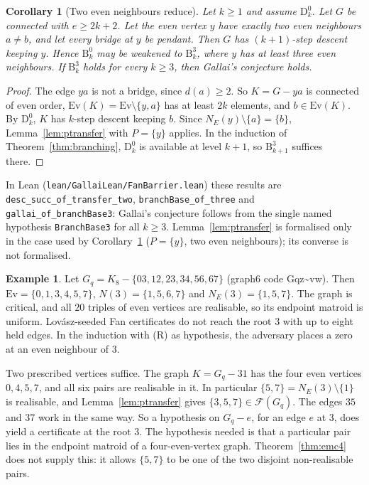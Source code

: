 \documentclass[11pt]{amsart}
\newtheorem{corollary}[theorem]{Corollary}
\theoremstyle{definition}
\newtheorem{example}[theorem]{Example}
\newcommand{\cF}{\mathcal F}
\newcommand{\Ev}{\mathrm{Ev}}
\begin{document}
\begin{corollary}[Two even neighbours reduce]\label{cor:twonbrs}
Let $k\ge1$ and assume $\mathrm{D}^0_k$. Let $G$ be connected with $e\ge 2k+2$. Let the even vertex
$y$ have exactly two even neighbours $a\ne b$, and let every bridge at $y$ be pendant. Then $G$ has
$(k+1)$-step descent keeping $y$. Hence $\mathrm{B}^0_k$ may be weakened to $\mathrm{B}^3_k$, where $y$
has at least three even neighbours. If $\mathrm{B}^3_k$ holds for every $k\ge3$, then Gallai's
conjecture holds.
\end{corollary}

\begin{proof}
The edge $ya$ is not a bridge, since $d(a)\ge2$. So $K=G-ya$ is connected of even order,
$\Ev(K)=\Ev\setminus\{y,a\}$ has at least $2k$ elements, and $b\in\Ev(K)$. By $\mathrm{D}^0_k$, $K$
has $k$-step descent keeping $b$. Since $N_E(y)\setminus\{a\}=\{b\}$, Lemma~\ref{lem:ptransfer} with
$P=\{y\}$ applies. In the induction of Theorem~\ref{thm:branching}, $\mathrm{D}^0_k$ is available at
level $k+1$, so $\mathrm{B}^3_{k+1}$ suffices there.
\end{proof}

{\sloppy In Lean (\texttt{lean/GallaiLean/FanBarrier.lean}) these results are \texttt{desc\_succ\_of\_transfer\_two},
\texttt{branchBase\_of\_three} and \texttt{gallai\_of\_branchBase3}: Gallai's conjecture follows from
the single named hypothesis \texttt{BranchBase3} for all $k\ge3$. Lemma~\ref{lem:ptransfer} is
formalised only in the case used by Corollary~\ref{cor:twonbrs} ($P=\{y\}$, two even neighbours);
its converse is not formalised.\par}

\begin{example}\label{ex:gqz}\sloppy
Let $G_q=K_8-\{03,12,23,34,56,67\}$ (graph6 code Gqz\textasciitilde vw). Then $\Ev=\{0,1,3,4,5,7\}$, $N(3)=\{1,5,6,7\}$ and
$N_E(3)=\{1,5,7\}$. The graph is critical, and all $20$ triples of even vertices are realisable, so its
endpoint matroid is uniform. Lov\'asz-seeded Fan certificates do not reach the root $3$ with up to
eight held edges. In the induction with (R) as hypothesis, the adversary places a zero at an even
neighbour of $3$.

Two prescribed vertices suffice. The graph $K=G_q-31$ has the four even vertices $0,4,5,7$, and all
six pairs are realisable in it. In particular $\{5,7\}=N_E(3)\setminus\{1\}$ is realisable, and
Lemma~\ref{lem:ptransfer} gives $\{3,5,7\}\in\cF(G_q)$. The edges $35$ and $37$ work in the same way.
So a hypothesis on $G_q-e$, for an edge $e$ at $3$, does yield a certificate at the root $3$. The
hypothesis needed is that a particular pair lies in the endpoint matroid of a four-even-vertex graph.
Theorem~\ref{thm:emc4} does not supply this: it allows $\{5,7\}$ to be one of the two disjoint
non-realisable pairs.
\end{example}
\end{document}
